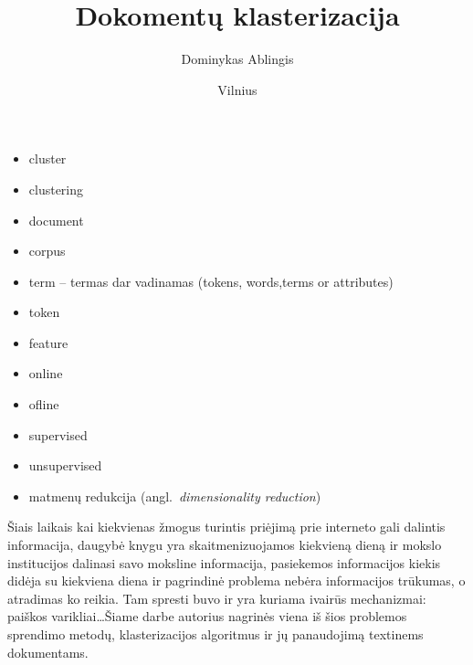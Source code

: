 \documentclass{VUMIFInfKursinis}
\title{Dokomentų klasterizacija}
\author{Dominykas Ablingis}
\date{Vilnius \\ \the\year}
\newif\iffast{} %
\begin{document}
\iffast{}
	\newcommand{\rewrite}[1]{\todo[linecolor=red,backgroundcolor=red!25,bordercolor=red]{#1}}
	\newcommand{\needsource}[1]{\todo[linecolor=blue,backgroundcolor=blue!25,bordercolor=blue,]{#1}}
	\newcommand{\toadd}[1]{\todo[linecolor=OliveGreen,backgroundcolor=OliveGreen!25,bordercolor=OliveGreen,]{#1}}
	\newcommand{\note}[1]{\todo[linecolor=Plum,backgroundcolor=Plum!25,bordercolor=Plum]{#1}}
	\newcommand{\thiswillnotshow}[1]{\todo[disable]{#1}}
	\listoftodos[Notes]
\else
	\newcommand{\rewrite}[1]{}
	\newcommand{\needsource}[1]{}
	\newcommand{\toadd}[1]{}
	\newcommand{\note}[1]{}
	\newcommand{\thiswillnotshow}[1]{}
\fi

\maketitle
\tableofcontents


\newcommand{\ltang}[2]{#1 (angl.\  \textit{#2}) }
\newcommand{\BigO}[1]{$\mathcal{O}(#1)$}

	\begin{itemize}
		\item cluster
		\item clustering
		\item document
		\item corpus
		\item term – termas dar vadinamas (tokens, words,terms or attributes)
		\item token
		\item feature
		\item online
		\item ofline
		\item supervised
		\item unsupervised
		\item \ltang{matmenų redukcija}{dimensionality reduction}
	\end{itemize}

	Šiais laikais kai kiekvienas žmogus turintis priėjimą prie interneto gali dalintis informacija, daugybė knygu yra skaitmenizuojamos kiekvieną dieną ir mokslo institucijos dalinasi savo moksline informacija, pasiekemos informacijos kiekis didėja su kiekviena diena ir pagrindinė problema nebėra informacijos trūkumas, o atradimas ko reikia. Tam spresti buvo ir yra kuriama ivairūs mechanizmai: paiškos varikliai\ldots Šiame darbe autorius nagrinės viena iš šios problemos sprendimo metodų, klasterizacijos algoritmus ir jų panaudojimą textinems dokumentams. %
\end{document}
